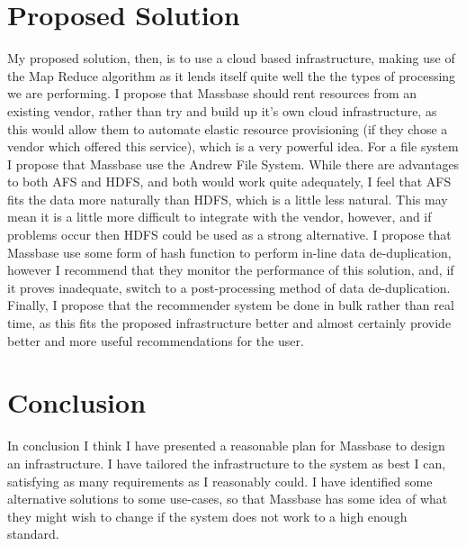\documentclass[12pt,a4paper]{article}
\begin{document}
\section{Proposed Solution}
My proposed solution, then, is to use a cloud based infrastructure, making use of the Map Reduce algorithm as it lends itself quite well the the types of processing we are performing. I propose that Massbase should rent resources from an existing vendor, rather than try and build up it's own cloud infrastructure, as this would allow them to automate elastic resource provisioning (if they chose a vendor which offered this service), which is a very powerful idea. For a file system I propose that Massbase use the Andrew File System. While there are advantages to both AFS and HDFS, and both would work quite adequately, I feel that AFS fits the data more naturally than HDFS, which is a little less natural. This may mean it is a little more difficult to integrate with the vendor, however, and if problems occur then HDFS could be used as a strong alternative. I propose that Massbase use some form of hash function to perform in-line data de-duplication, however I recommend that they monitor the performance of this solution, and, if it proves inadequate, switch to a post-processing method of data de-duplication. Finally, I propose that the recommender system be done in bulk rather than real time, as this fits the proposed infrastructure better and almost certainly provide better and more useful recommendations for the user.
	
\section{Conclusion}
In conclusion I think I have presented a reasonable plan for Massbase to design an infrastructure. I have tailored the infrastructure to the system as best I can, satisfying as many requirements as I reasonably could. I have identified some alternative solutions to some use-cases, so that Massbase has some idea of  what they might wish to change if the system does not work to a high enough standard.
\end{document}
